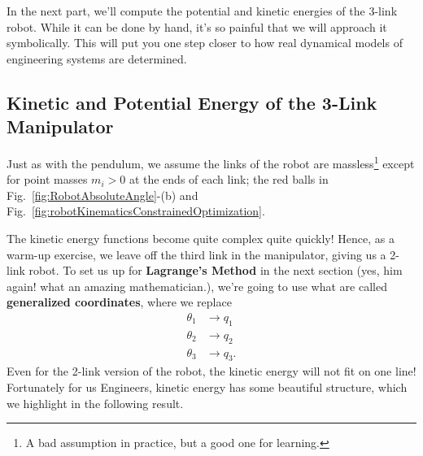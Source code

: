 \begin{itemize}
    In the next part, we'll compute the potential and kinetic energies of the 3-link robot. While it can be done by hand, it's so painful that we will approach it symbolically. This will put you one step closer to how real dynamical models of engineering systems are determined.
    
\end{itemize}

\subsection{Kinetic and Potential Energy of the 3-Link Manipulator}

Just as with the pendulum, we assume the links of the robot are massless\footnote{A bad assumption in practice, but a good one for learning.} except for point masses $m_i>0$ at the ends of each link; the red balls in Fig.~\ref{fig:RobotAbsoluteAngle}-(b) and Fig.~\ref{fig:robotKinematicsConstrainedOptimization}. 

The kinetic energy functions become quite complex quite quickly! Hence, as a warm-up exercise, we leave off the third link in the manipulator, giving us a 2-link robot. To set us up for \textbf{Lagrange's Method} in the next section (yes, him again! what an amazing mathematician.), we're going to use what are called \textbf{generalized coordinates}, where we replace
\begin{align*}
    \theta_1 &\to q_1 \\
    \theta_2 &\to q_2\\
    \theta_3 &\to q_3.
\end{align*}
Even for the 2-link version of the robot, the kinetic energy will not fit on one line! Fortunately for us Engineers, kinetic energy has some beautiful structure, which we highlight in the following result.

